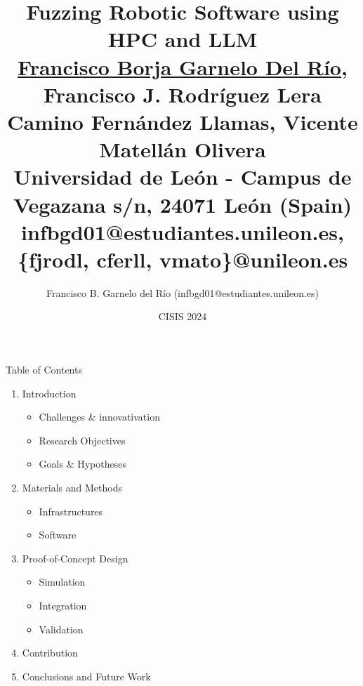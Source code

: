 \documentclass[aspectratio=169]{beamer}
\title[{\fz} robots HPC \& LLM]{\textbf{Fuzzing Robotic Software using HPC and LLM}\\
\small{\underline{Francisco Borja Garnelo Del Río}, Francisco J. Rodríguez Lera } \\
\small{Camino Fernández Llamas, Vicente Matellán Olivera} \\
\tiny{Universidad de León - 
Campus de Vegazana s/n, 24071 León (Spain)} \\
\tiny{infbgd01@estudiantes.unileon.es, \{fjrodl, cferll, vmato\}@unileon.es}
}
\author{Francisco B. Garnelo del Río (infbgd01@estudiantes.unileon.es)}
\date{CISIS 2024}
\begin{document}


\titleframe
 \begin{frame}{Table of Contents}
\begin{enumerate}
\item Introduction
\begin{itemize}
    \item Challenges \& innovativation
    \item Research Objectives
    \item Goals \& Hypotheses
\end{itemize}
\item Materials and Methods
\begin{itemize}
    \item Infrastructures
    \item Software
\end{itemize}
\item Proof-of-Concept Design
\begin{itemize}
    \item Simulation
    \item Integration
    \item Validation    
\end{itemize}    
\item Contribution
\item Conclusions and Future Work
\end{enumerate}
 \end{frame}

\end{document}
